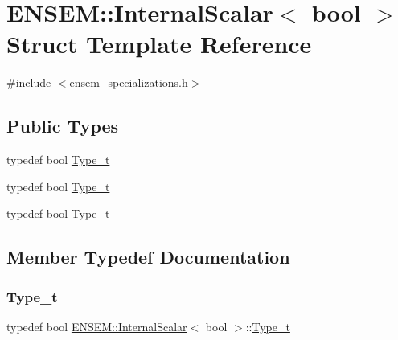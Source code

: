 \hypertarget{structENSEM_1_1InternalScalar_3_01bool_01_4}{}\section{E\+N\+S\+EM\+:\+:Internal\+Scalar$<$ bool $>$ Struct Template Reference}
\label{structENSEM_1_1InternalScalar_3_01bool_01_4}


{\ttfamily \#include $<$ensem\+\_\+specializations.\+h$>$}

\subsection*{Public Types}
\begin{DoxyCompactItemize}
\item 
typedef bool \mbox{\hyperlink{structENSEM_1_1InternalScalar_3_01bool_01_4_a3fe5fad0f8af43221744c3ddb40131a0}{Type\+\_\+t}}
\item 
typedef bool \mbox{\hyperlink{structENSEM_1_1InternalScalar_3_01bool_01_4_a3fe5fad0f8af43221744c3ddb40131a0}{Type\+\_\+t}}
\item 
typedef bool \mbox{\hyperlink{structENSEM_1_1InternalScalar_3_01bool_01_4_a3fe5fad0f8af43221744c3ddb40131a0}{Type\+\_\+t}}
\end{DoxyCompactItemize}


\subsection{Member Typedef Documentation}
\mbox{\label{structENSEM_1_1InternalScalar_3_01bool_01_4_a3fe5fad0f8af43221744c3ddb40131a0}} 
\subsubsection{\texorpdfstring{Type\_t}{Type\_t}\hspace{0.1cm}{\footnotesize\ttfamily [1/3]}}
{\footnotesize\ttfamily typedef bool \mbox{\hyperlink{structENSEM_1_1InternalScalar}{E\+N\+S\+E\+M\+::\+Internal\+Scalar}}$<$ bool $>$\+::\mbox{\hyperlink{structENSEM_1_1InternalScalar_3_01bool_01_4_a3fe5fad0f8af43221744c3ddb40131a0}{Type\+\_\+t}}}


